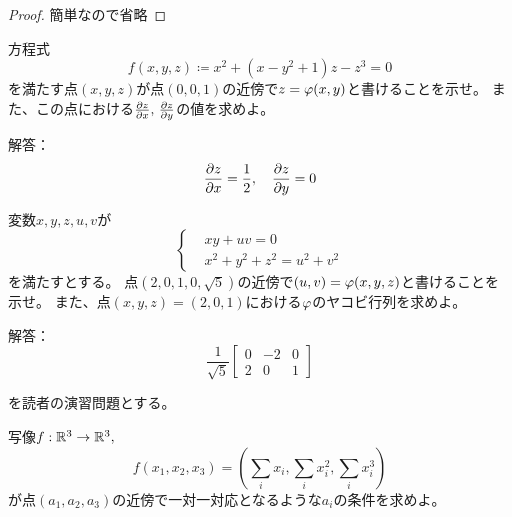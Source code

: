 \documentclass[report]{jlreq}
\begin{document}
\begin{proof}
    簡単なので省略
\end{proof}












\begin{problem}
    方程式
    \begin{equation}
        f(x, y, z) \coloneqq x^2 + (x - y^2 + 1) z - z^3 = 0
    \end{equation}
    を満たす点$(x, y, z)$が点$(0, 0, 1)$の近傍で$z = \varphi(x, y)$と書けることを示せ。
    また、この点における$\deldel[z]{x},\, \deldel[z]{y}$の値を求めよ。

    解答：
    \begin{equation}
        \deldel[z]{x} = \frac{1}{2},\quad \deldel[z]{y} = 0
    \end{equation}
\end{problem}

\begin{problem}
    変数$x, y, z, u, v$が
    \begin{equation}
        \begin{cases}
            &xy + uv = 0 \\
            &x^2 + y^2 + z^2 = u^2 + v^2
        \end{cases}
    \end{equation}
    を満たすとする。
    点$(2, 0, 1, 0, \sqrt{5})$の近傍で$(u, v) = \varphi(x, y, z)$と書けることを示せ。
    また、点$(x, y, z) = (2, 0, 1)$における$\varphi$のヤコビ行列を求めよ。

    解答：
    \begin{equation}
        \frac{1}{\sqrt{5}} \begin{bmatrix}
            0 & -2 & 0 \\
            2 & 0 & 1
        \end{bmatrix}
    \end{equation}
\end{problem}

\begin{problem}
    \cite[第II章 問6.2]{杉浦+89}
    を読者の演習問題とする。
\end{problem}



\begin{problem}
    写像$f: \mathbb{R}^3 \to \mathbb{R}^3,$
    \begin{equation}
        f(x_1, x_2, x_3) = \left( \sum_i x_i, \sum_i x_i^2, \sum_i x_i^3\right)
    \end{equation}
    が点$(a_1, a_2, a_3)$の近傍で一対一対応となるような$a_i$の条件を求めよ。
\end{problem}
\end{document}

